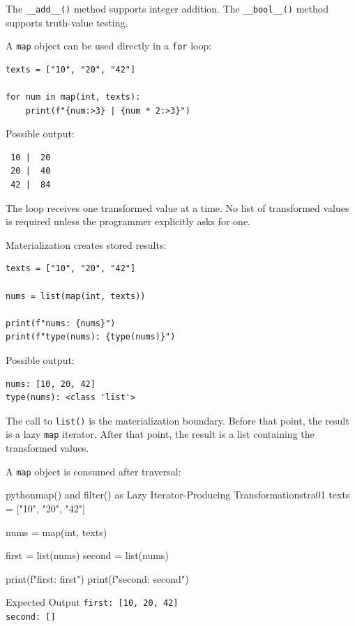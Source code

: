 The \texttt{\_\_add\_\_()} method supports integer addition. The \texttt{\_\_bool\_\_()} method supports truth-value testing.

A \texttt{map} object can be used directly in a \texttt{for} loop:

\begin{verbatim}
texts = ["10", "20", "42"]

for num in map(int, texts):
    print(f"{num:>3} | {num * 2:>3}")
\end{verbatim}

Possible output:

\begin{verbatim}
 10 |  20
 20 |  40
 42 |  84
\end{verbatim}

The loop receives one transformed value at a time. No list of transformed values is required unless the programmer explicitly asks for one.

Materialization creates stored results:

\begin{verbatim}
texts = ["10", "20", "42"]

nums = list(map(int, texts))

print(f"nums: {nums}")
print(f"type(nums): {type(nums)}")
\end{verbatim}

Possible output:

\begin{verbatim}
nums: [10, 20, 42]
type(nums): <class 'list'>
\end{verbatim}

The call to \texttt{list()} is the materialization boundary. Before that point, the result is a lazy \texttt{map} iterator. After that point, the result is a list containing the transformed values.

A \texttt{map} object is consumed after traversal:

\begin{codebox}[]{python}{map() and filter() as Lazy Iterator-Producing Transformations}{tra01}
texts = ["10", "20", "42"]

nums = map(int, texts)

first = list(nums)
second = list(nums)

print(f"first: {first}")
print(f"second: {second}")
\end{codebox}


\begin{iobox}{Expected Output}
\texttt{first: [10, 20, 42]} \\
\texttt{second: []} \\
\end{iobox}


